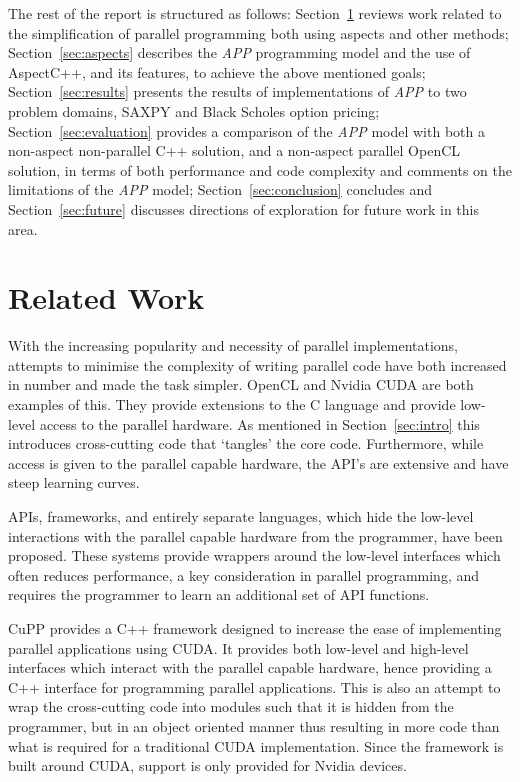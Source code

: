 \documentclass{sig-alternate-05-2015}
\begin{document}
The rest of the report is structured as follows: Section~\ref{sec:related}
reviews work related to the simplification of parallel programming both using
aspects and other methods;
Section~\ref{sec:aspects} describes the \textit{APP} programming model and the use 
of AspectC++, and its features, to achieve the above mentioned goals; Section~\ref{sec:results}
presents the results of implementations of \textit{APP} to two problem domains,
SAXPY and Black Scholes option pricing;
Section~\ref{sec:evaluation} provides a comparison of the \textit{APP} model 
with both a non-aspect non-parallel C++ solution, and a
non-aspect parallel OpenCL solution, in terms of both performance and code
complexity and comments on the limitations of the \textit{APP} model; 
Section~\ref{sec:conclusion} concludes and Section~\ref{sec:future}
discusses directions of exploration for future work in this area.

\section{Related Work}\label{sec:related}

With the increasing popularity and necessity of parallel implementations,
attempts to minimise the complexity of writing parallel code have both increased
in number and made the task simpler. OpenCL and Nvidia CUDA are both examples of
this. They provide extensions to the C language and provide low-level
access to the parallel hardware. As mentioned in Section~\ref{sec:intro} this
introduces cross-cutting code that `tangles' the core code. Furthermore, while
access is given to the parallel capable hardware, the API's are extensive and
have steep learning curves.

APIs, frameworks, and entirely separate languages, which hide the low-level 
interactions with the parallel capable hardware from the programmer, have been
proposed. These systems provide wrappers around the low-level interfaces 
which often reduces performance, a key consideration in parallel programming,  
and requires the programmer to learn an additional set of API functions.

CuPP \cite{breit:cupp} provides a C++ framework designed to increase the ease of implementing parallel
applications using CUDA. It provides both low-level and high-level interfaces
which interact with the parallel capable hardware, hence providing a C++
interface for programming parallel applications. This is also an attempt to wrap
the cross-cutting code into modules such that it is hidden from  the programmer,
but in an object oriented manner thus resulting in more code than what is
required for a traditional CUDA implementation. Since the framework is built
around CUDA, support is only provided for Nvidia devices.
\end{document}

